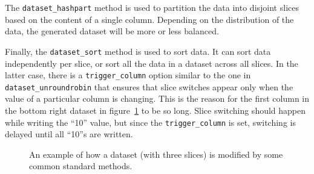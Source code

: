 The \texttt{dataset\_hashpart} method is used to partition the data
into disjoint slices based on the content of a single column.
Depending on the distribution of the data, the generated dataset will
be more or less balanced.

Finally, the \texttt{dataset\_sort} method is used to sort data.  It
can sort data independently per slice, or sort all the data in a
dataset across all slices.  In the latter case, there is
a \texttt{trigger\_column} option similar to the one
in \texttt{dataset\_unroundrobin} that ensures that slice switches
appear only when the value of a particular column is changing.  This
is the reason for the first column in the bottom right dataset in
figure~\ref{fig:ds_ops} to be so long.  Slice switching should happen
while writing the ``10'' value, but since the \texttt{trigger\_column}
is set, switching is delayed until all ``10''s are written.

\begin{figure}
  \begin{center}
     
     \caption{An example of how a dataset (with three slices) is modified by some common standard methods.}
     \label{fig:ds_ops}
  \end{center}
\end{figure}
